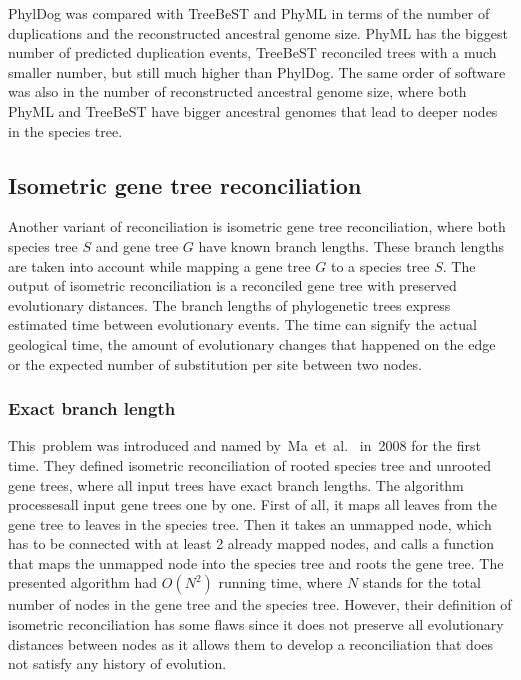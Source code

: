 PhylDog was compared with TreeBeST and PhyML \cite{phyldog} in terms of the number of duplications and the reconstructed ancestral genome size. PhyML has the biggest number of predicted duplication events, TreeBeST reconciled trees with a much smaller number, but still much higher than PhylDog. The same order of software was also in the number of reconstructed ancestral genome size, where both PhyML and TreeBeST have bigger ancestral genomes that lead to deeper nodes in the species tree.

\subsection{Isometric gene tree reconciliation}
Another variant of reconciliation is isometric gene tree reconciliation, where both species tree $S$ and gene tree $G$ have known branch lengths. These branch lengths are taken into account while mapping a gene tree $G$ to a species tree $S$. The output of isometric reconciliation is a reconciled gene tree with preserved evolutionary distances. The branch lengths of phylogenetic trees express estimated time between evolutionary events. The time can signify the actual geological time, the amount of evolutionary changes that happened on the edge or the expected number of substitution per site between two nodes.

\subsubsection{Exact branch length}

This~problem was introduced and named by~Ma~et~al.~\cite{ma} in~2008 for the first time. They defined isometric reconciliation of rooted species tree and unrooted gene trees, where all input trees have exact branch lengths. The algorithm processesall input gene trees one by one. First of all, it maps all leaves from the gene tree to leaves in the species tree. Then it takes an unmapped node, which has to be connected with at least 2 already mapped nodes, and calls a function that maps the unmapped node into the species tree and roots the gene tree. The presented algorithm had $O(N^2)$ running time, where $N$ stands for the total number of nodes in the gene tree and the species tree. However, their definition of isometric reconciliation has some flaws since it does not preserve all evolutionary distances between nodes as it allows them to develop a reconciliation that does not satisfy any history of evolution.

